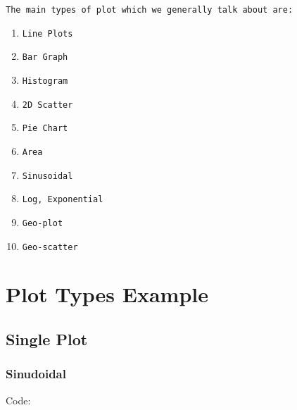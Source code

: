 \documentclass{plot-softwaremanual}
\begin{document}
\newpage
\begin{block}
\texttt{The main types of plot which we generally talk about are:}
  \begin{enumerate}
    \item {\tt Line Plots}
    \item {\tt Bar Graph}
    \item {\tt Histogram}
    \item {\tt 2D Scatter}
    \item {\tt Pie Chart}
    \item {\tt Area}
    \item {\tt Sinusoidal}
    \item {\tt Log, Exponential}
    \item {\tt Geo-plot}
    \item {\tt Geo-scatter}
    
  \end{enumerate}
\end{block}


\section{Plot Types Example}
\subsection{Single Plot}
\subsubsection{Sinudoidal}
Code:\\
\vspace{}
\hspace{}
\noindent{}
\end{document}
